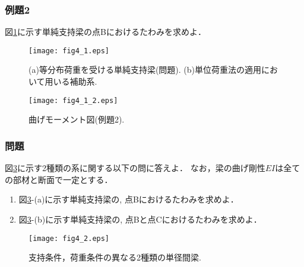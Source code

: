 \documentclass[10pt,a4j]{jarticle}
\begin{document}
\subsubsection{例題2}
	図\ref{fig:fig2_5}に示す単純支持梁の点Bにおけるたわみを求めよ．
\begin{figure}[h]
	\begin{center}
	\texttt{[image: fig4\_1.eps]} 
	\end{center}
	\caption{(a)等分布荷重を受ける単純支持梁(問題).
	 (b)単位荷重法の適用において用いる補助系.} 
	\label{fig:fig2_5}
\end{figure}
\begin{figure}[h]
	\begin{center}
	\texttt{[image: fig4\_1\_2.eps]} 
	\end{center}
	\caption{曲げモーメント図(例題2).}
	\label{fig:fig2_6}
\end{figure}
\subsubsection{問題}
図\ref{fig:fig2_4}に示す2種類の系に関する以下の問に答えよ．
なお，梁の曲げ剛性$EI$は全ての部材と断面で一定とする．
\begin{enumerate}
\item
	図\ref{fig:fig2_4}-(a)に示す単純支持梁の, 点Bにおけるたわみを求めよ．
\item
	図\ref{fig:fig2_4}-(b)に示す単純支持梁の, 点Bと点Cにおけるたわみを求めよ．
\end{enumerate}
\begin{figure}[h]
	\begin{center}
	\texttt{[image: fig4\_2.eps]} 
	\end{center}
	\caption{支持条件，荷重条件の異なる2種類の単径間梁.} 
	\label{fig:fig2_4}
\end{figure}
\end{document}
